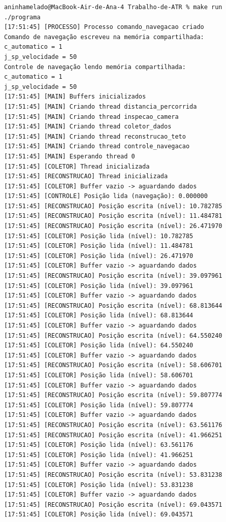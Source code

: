 \documentclass[12pt]{article}
\begin{document}
\begin{verbatim}
aninhamelado@MacBook-Air-de-Ana-4 Trabalho-de-ATR % make run
./programa
[17:51:45] [PROCESSO] Processo comando_navegacao criado
Comando de navegação escreveu na memória compartilhada:
c_automatico = 1
j_sp_velocidade = 50
Controle de navegação lendo memória compartilhada:
c_automatico = 1
j_sp_velocidade = 50
[17:51:45] [MAIN] Buffers inicializados
[17:51:45] [MAIN] Criando thread distancia_percorrida
[17:51:45] [MAIN] Criando thread inspecao_camera
[17:51:45] [MAIN] Criando thread coletor_dados
[17:51:45] [MAIN] Criando thread reconstrucao_teto
[17:51:45] [MAIN] Criando thread controle_navegacao
[17:51:45] [MAIN] Esperando thread 0
[17:51:45] [COLETOR] Thread inicializada
[17:51:45] [RECONSTRUCAO] Thread inicializada
[17:51:45] [COLETOR] Buffer vazio -> aguardando dados
[17:51:45] [CONTROLE] Posição lida (navegação): 0.000000
[17:51:45] [RECONSTRUCAO] Posição escrita (nível): 10.782785
[17:51:45] [RECONSTRUCAO] Posição escrita (nível): 11.484781
[17:51:45] [RECONSTRUCAO] Posição escrita (nível): 26.471970
[17:51:45] [COLETOR] Posição lida (nível): 10.782785
[17:51:45] [COLETOR] Posição lida (nível): 11.484781
[17:51:45] [COLETOR] Posição lida (nível): 26.471970
[17:51:45] [COLETOR] Buffer vazio -> aguardando dados
[17:51:45] [RECONSTRUCAO] Posição escrita (nível): 39.097961
[17:51:45] [COLETOR] Posição lida (nível): 39.097961
[17:51:45] [COLETOR] Buffer vazio -> aguardando dados
[17:51:45] [RECONSTRUCAO] Posição escrita (nível): 68.813644
[17:51:45] [COLETOR] Posição lida (nível): 68.813644
[17:51:45] [COLETOR] Buffer vazio -> aguardando dados
[17:51:45] [RECONSTRUCAO] Posição escrita (nível): 64.550240
[17:51:45] [COLETOR] Posição lida (nível): 64.550240
[17:51:45] [COLETOR] Buffer vazio -> aguardando dados
[17:51:45] [RECONSTRUCAO] Posição escrita (nível): 58.606701
[17:51:45] [COLETOR] Posição lida (nível): 58.606701
[17:51:45] [COLETOR] Buffer vazio -> aguardando dados
[17:51:45] [RECONSTRUCAO] Posição escrita (nível): 59.807774
[17:51:45] [COLETOR] Posição lida (nível): 59.807774
[17:51:45] [COLETOR] Buffer vazio -> aguardando dados
[17:51:45] [RECONSTRUCAO] Posição escrita (nível): 63.561176
[17:51:45] [RECONSTRUCAO] Posição escrita (nível): 41.966251
[17:51:45] [COLETOR] Posição lida (nível): 63.561176
[17:51:45] [COLETOR] Posição lida (nível): 41.966251
[17:51:45] [COLETOR] Buffer vazio -> aguardando dados
[17:51:45] [RECONSTRUCAO] Posição escrita (nível): 53.831238
[17:51:45] [COLETOR] Posição lida (nível): 53.831238
[17:51:45] [COLETOR] Buffer vazio -> aguardando dados
[17:51:45] [RECONSTRUCAO] Posição escrita (nível): 69.043571
[17:51:45] [COLETOR] Posição lida (nível): 69.043571

\end{verbatim}
\end{document}
